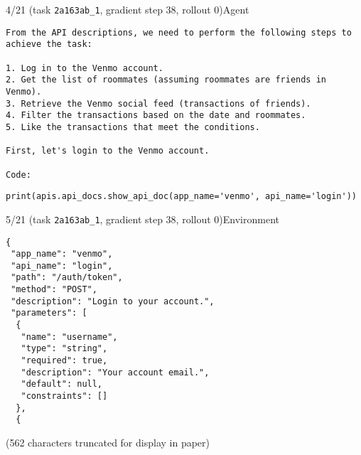 \begin{minipage}{0.95\linewidth}
\begin{assistant_message_box}{{4/21 (task \texttt{2a163ab\_1}, gradient step 38, rollout 0)\hfill Agent}}
\scriptsize
\begin{Verbatim}[breaklines]
From the API descriptions, we need to perform the following steps to achieve the task:

1. Log in to the Venmo account.
2. Get the list of roommates (assuming roommates are friends in Venmo).
3. Retrieve the Venmo social feed (transactions of friends).
4. Filter the transactions based on the date and roommates.
5. Like the transactions that meet the conditions.

First, let's login to the Venmo account.

Code:
\end{Verbatim}
\begin{tcolorbox}[colback=codebgcolor,boxrule=0pt]\begin{Verbatim}[breaklines]
print(apis.api_docs.show_api_doc(app_name='venmo', api_name='login'))
\end{Verbatim}
\end{tcolorbox}\end{assistant_message_box}
\end{minipage}

\hspace*{8mm}%
\begin{minipage}{1.0\linewidth}
\begin{user_message_box}{{5/21 (task \texttt{2a163ab\_1}, gradient step 38, rollout 0)\hfill Environment}}
\scriptsize
\begin{Verbatim}[breaklines]
{
 "app_name": "venmo",
 "api_name": "login",
 "path": "/auth/token",
 "method": "POST",
 "description": "Login to your account.",
 "parameters": [
  {
   "name": "username",
   "type": "string",
   "required": true,
   "description": "Your account email.",
   "default": null,
   "constraints": []
  },
  {
\end{Verbatim}
(562 characters truncated for display in paper)\end{user_message_box}
\end{minipage}

